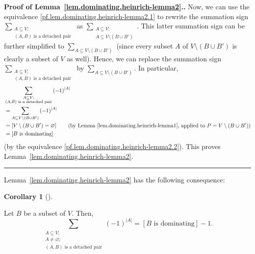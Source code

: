 \documentclass[numbers=enddot,12pt,final,onecolumn,notitlepage]{scrartcl}%
\theoremstyle{definition}
\newtheorem{coro}[theo]{Corollary}
\newenvironment{corollary}[1][]
{\begin{coro}[#1]\begin{leftbar}}
{\end{leftbar}\end{coro}}
\newenvironment{proof}[1][Proof]{\noindent\textbf{#1.} }{\ \rule{0.5em}{0.5em}}
\let\sumnonlimits\sum
\renewcommand{\sum}{\sumnonlimits\limits}
\newcommand{\abs}[1]{\left| #1 \right|}
\newcommand{\tup}[1]{\left( #1 \right)}
\newcommand{\ive}[1]{\left[ #1 \right]}
\begin{document}
\begin{proof}[Proof of Lemma~\ref{lem.dominating.heinrich-lemma2}.]
Now, we can use the equivalence
\eqref{pf.lem.dominating.heinrich-lemma2.1} to rewrite the summation
sign $\sum_{\substack{A \subseteq V; \\ \tup{A, B}
\text{ is a detached pair}}}$ as
$\sum_{\substack{A \subseteq V; \\
A \subseteq V \setminus \tup{B \cup B'}}}$. This latter summation sign
can be further simplified to
$\sum_{A \subseteq V \setminus \tup{B \cup B'}}$ (since every subset
$A$ of $V \setminus \tup{B \cup B'}$ is clearly a subset of $V$ as
well). Hence, we can replace the summation sign
$\sum_{\substack{A \subseteq V; \\ \tup{A, B}
\text{ is a detached pair}}}$ by
$\sum_{A \subseteq V \setminus \tup{B \cup B'}}$. In particular,
\begin{align*}
& \sum_{\substack{A \subseteq V; \\ \tup{A, B}
\text{ is a detached pair}}} \tup{-1}^{\abs{A}} \\
&= \sum_{A \subseteq V \setminus \tup{B \cup B'}} \tup{-1}^{\abs{A}}
\\
&= \ive{ V \setminus \tup{B \cup B'} = \varnothing }
\qquad
\left( \text{by Lemma~\ref{lem.dominating.heinrich-lemma1}, applied
         to } P = V \setminus \tup{B \cup B'} \right) \\
&= \ive{B \text{ is dominating}}
\end{align*}
(by the equivalence \eqref{pf.lem.dominating.heinrich-lemma2.2}).
This proves Lemma~\ref{lem.dominating.heinrich-lemma2}.
\end{proof}

Lemma~\ref{lem.dominating.heinrich-lemma2} has the following
consequence:

\begin{corollary} \label{cor.dominating.heinrich-lemma2c}
Let $B$ be a subset of $V$. Then,
\[
\sum_{\substack{A \subseteq V; \\ A \neq \varnothing; \\
\tup{A, B} \text{ is a detached pair}}}
\tup{-1}^{\abs{A}}
= \ive{B \text{ is dominating}} - 1.
\]
\end{corollary}
\end{document}
